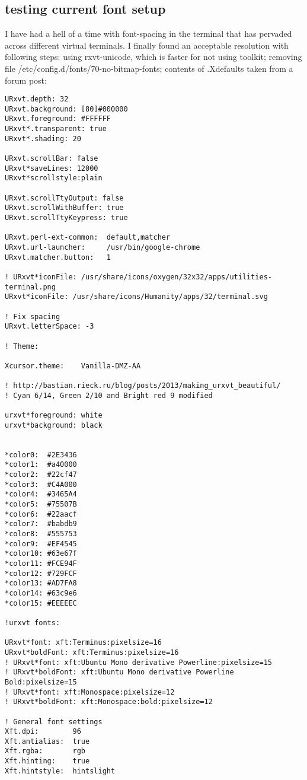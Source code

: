 \subsection*{ testing current font setup }
I have had a hell of a time with font-spacing in the terminal that has pervaded across different virtual terminals. I finally found an acceptable resolution with following steps:
using rxvt-unicode, which is faster for not using toolkit;
removing file /etc/config.d/fonts/70-no-bitmap-fonts;
contents of .Xdefaults taken from a forum post:

\begin{lstlisting}
URxvt.depth: 32
URxvt.background: [80]#000000
URxvt.foreground: #FFFFFF
URxvt*.transparent: true
URxvt*.shading: 20

URxvt.scrollBar: false
URxvt*saveLines: 12000
URxvt*scrollstyle:plain

URxvt.scrollTtyOutput: false
URxvt.scrollWithBuffer: true
URxvt.scrollTtyKeypress: true

URxvt.perl-ext-common:  default,matcher
URxvt.url-launcher:     /usr/bin/google-chrome
URxvt.matcher.button:   1

! URxvt*iconFile: /usr/share/icons/oxygen/32x32/apps/utilities-terminal.png
URxvt*iconFile: /usr/share/icons/Humanity/apps/32/terminal.svg

! Fix spacing
URxvt.letterSpace: -3

! Theme:

Xcursor.theme:    Vanilla-DMZ-AA

! http://bastian.rieck.ru/blog/posts/2013/making_urxvt_beautiful/
! Cyan 6/14, Green 2/10 and Bright red 9 modified

urxvt*foreground: white
urxvt*background: black


*color0:  #2E3436
*color1:  #a40000
*color2:  #22cf47
*color3:  #C4A000
*color4:  #3465A4
*color5:  #75507B
*color6:  #22aacf
*color7:  #babdb9
*color8:  #555753
*color9:  #EF4545
*color10: #63e67f
*color11: #FCE94F
*color12: #729FCF
*color13: #AD7FA8
*color14: #63c9e6
*color15: #EEEEEC

!urxvt fonts: 

URxvt*font: xft:Terminus:pixelsize=16
URxvt*boldFont: xft:Terminus:pixelsize=16
! URxvt*font: xft:Ubuntu Mono derivative Powerline:pixelsize=15
! URxvt*boldFont: xft:Ubuntu Mono derivative Powerline Bold:pixelsize=15
! URxvt*font: xft:Monospace:pixelsize=12
! URxvt*boldFont: xft:Monospace:bold:pixelsize=12

! General font settings
Xft.dpi:        96
Xft.antialias:  true
Xft.rgba:       rgb
Xft.hinting:    true
Xft.hintstyle:  hintslight
\end{lstlisting}

